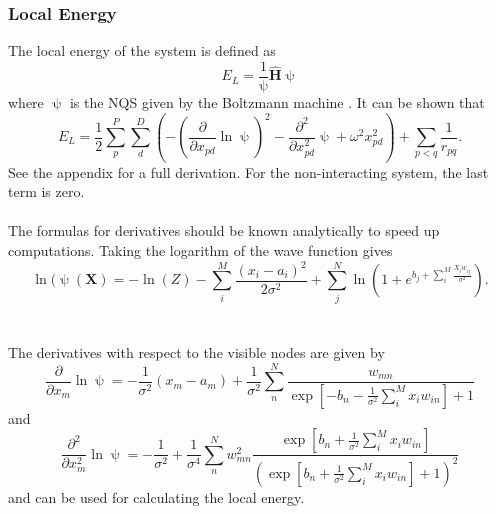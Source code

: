 \subsubsection{Local Energy}
The local energy of the system is defined as
\begin{equation}
E_L = \frac{1}{\uppsi}\hat{\boldsymbol{H}}\uppsi
\end{equation}
where $\uppsi$ is the NQS given by the Boltzmann machine \cite{mhj_ml}. It can be shown that
\begin{equation}
E_L = \frac{1}{2}\sum_p^P\sum_d^D\left(-\left(\frac{\partial}{\partial x_{pd}}\ln \uppsi \right)^2 - \frac{\partial^2}{\partial x^2_{pd}}\uppsi + \omega^2x_{pd}^2\right) + \sum_{p<q}\frac{1}{r_{pq}}.
\end{equation}
See the appendix for a full derivation. For the non-interacting system, the last term is zero. 
\\
\\
The formulas for derivatives should be known analytically to speed up computations. 
Taking the logarithm of the wave function gives 
\begin{equation}
    \ln(\uppsi(\boldsymbol{X}) = -\ln(Z) - \sum_i^M\frac{(x_i - a_i)^2}{2\sigma^2} + \sum_j^N\ln(1 + e^{b_j + \sum_i^M\frac{X_iw_{ij}}{\sigma^2}}).
\end{equation}
\\
\\
The derivatives with respect to the visible nodes are given by
\begin{equation}
    \frac{\partial}{\partial x_m}\ln \uppsi = -\frac{1}{\sigma^2}(x_m - a_m) + \frac{1}{\sigma^2} \sum_n^N \frac{w_{mn}}{\exp\left[-b_n - \frac{1}{\sigma^2}\sum_i^Mx_iw_{in}\right] + 1}
\end{equation}
and 
\begin{equation}
    \frac{\partial^2}{\partial x_m^2}\ln \uppsi = -\frac{1}{\sigma^2} + \frac{1}{\sigma^4}\sum_n^N w^2_{mn}\frac{\exp\left[b_n + \frac{1}{\sigma^2}\sum_i^Mx_iw_{in}\right]}{\left(\exp\left[b_n + \frac{1}{\sigma^2}\sum_i^Mx_iw_{in}\right]+1\right)^2}
\end{equation}
\cite{mhj_ml} and can be used for calculating the local energy. 

